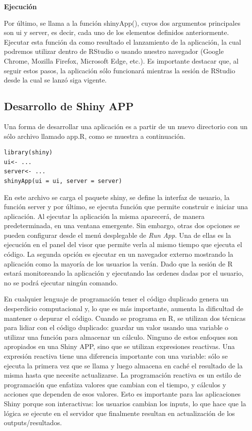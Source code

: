 \textbf{Ejecución}

Por último, se llama a la función shinyApp(), cuyos dos argumentos principales son ui y server, es decir, cada uno de los elementos definidos anteriormente. Ejecutar esta función da como resultado el lanzamiento de la aplicación, la cual podremos utilizar dentro de RStudio o usando nuestro navegador (Google Chrome, Mozilla Firefox, Microsoft Edge, etc.). Es importante destacar que, al seguir estos pasos, la aplicación sólo funcionará mientras la sesión de RStudio desde la cual se lanzó siga vigente.


\subsection{Desarrollo de Shiny APP}

Una forma de desarrollar una  aplicación es a partir de un nuevo directorio con un sólo archivo llamado app.R, como se muestra a continuación. 

\begin{lstlisting}
library(shiny)
ui<- ...
server<- ...
shinyApp(ui = ui, server = server)
\end{lstlisting}

En este archivo se carga el paquete shiny, se define la interfaz de usuario, la función server y por último, se ejecuta función que permite construir e iniciar una aplicación. Al ejecutar la aplicación la misma aparecerá, de manera predeterminada, en una ventana emergente. Sin embargo, otras dos opciones se pueden configurar desde el menú desplegable de \emph{Run App}. Una de ellas es la ejecución en el panel del visor que permite verla al mismo tiempo que ejecuta el código. La segunda opción es ejecutar en un navegador externo mostrando la aplicación como la mayoría de los usuarios la verán. Dado que la sesión de R estará monitoreando la aplicación y ejecutando las ordenes dadas por el usuario, no se podrá ejecutar ningún comando.

En cualquier lenguaje de programación tener el código duplicado genera un desperdicio computacional y, lo que es más importante, aumenta la dificultad de mantener o depurar el código. Cuando se programa en R, se utilizan dos técnicas para lidiar con el código duplicado: guardar un valor usando una variable o utilizar una función para almacenar un cálculo. Ninguno de estos enfoques son apropiados en una Shiny APP, sino que se utilizan expresiones reactivas. Una expresión reactiva tiene una diferencia importante con una variable: sólo se ejecuta la primera vez que se llama y luego almacena en caché el resultado de la misma hasta que necesite actualizarse. La programación reactiva es un estilo de programación que enfatiza valores que cambian con el tiempo, y cálculos y acciones que dependen de esos valores. Esto es importante para las aplicaciones Shiny porque son interactivas: los usuarios cambian los inputs, lo que hace que la lógica se ejecute en el servidor que finalmente resultan en actualización de los outputs/resultados.


